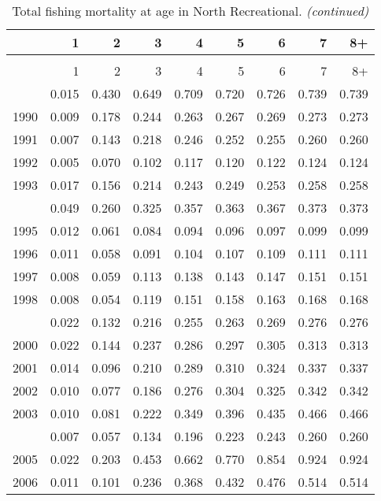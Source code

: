 \documentclass[
]{article}
\begin{document}
\begin{longtable}[t]{lrrrrrrrr}
\caption{\label{tab:North_Recreational-fleet-FAA-table}Total fishing mortality at age in North Recreational.}\\
\toprule
  & 1 & 2 & 3 & 4 & 5 & 6 & 7 & 8+\\
\midrule
\endfirsthead
\caption[]{Total fishing mortality at age in North Recreational. \textit{(continued)}}\\
\toprule
  & 1 & 2 & 3 & 4 & 5 & 6 & 7 & 8+\\
\midrule
\endhead

\endfoot
\bottomrule
\endlastfoot
1989 & 0.015 & 0.430 & 0.649 & 0.709 & 0.720 & 0.726 & 0.739 & 0.739\\
1990 & 0.009 & 0.178 & 0.244 & 0.263 & 0.267 & 0.269 & 0.273 & 0.273\\
1991 & 0.007 & 0.143 & 0.218 & 0.246 & 0.252 & 0.255 & 0.260 & 0.260\\
1992 & 0.005 & 0.070 & 0.102 & 0.117 & 0.120 & 0.122 & 0.124 & 0.124\\
1993 & 0.017 & 0.156 & 0.214 & 0.243 & 0.249 & 0.253 & 0.258 & 0.258\\
\addlinespace
1994 & 0.049 & 0.260 & 0.325 & 0.357 & 0.363 & 0.367 & 0.373 & 0.373\\
1995 & 0.012 & 0.061 & 0.084 & 0.094 & 0.096 & 0.097 & 0.099 & 0.099\\
1996 & 0.011 & 0.058 & 0.091 & 0.104 & 0.107 & 0.109 & 0.111 & 0.111\\
1997 & 0.008 & 0.059 & 0.113 & 0.138 & 0.143 & 0.147 & 0.151 & 0.151\\
1998 & 0.008 & 0.054 & 0.119 & 0.151 & 0.158 & 0.163 & 0.168 & 0.168\\
\addlinespace
1999 & 0.022 & 0.132 & 0.216 & 0.255 & 0.263 & 0.269 & 0.276 & 0.276\\
2000 & 0.022 & 0.144 & 0.237 & 0.286 & 0.297 & 0.305 & 0.313 & 0.313\\
2001 & 0.014 & 0.096 & 0.210 & 0.289 & 0.310 & 0.324 & 0.337 & 0.337\\
2002 & 0.010 & 0.077 & 0.186 & 0.276 & 0.304 & 0.325 & 0.342 & 0.342\\
2003 & 0.010 & 0.081 & 0.222 & 0.349 & 0.396 & 0.435 & 0.466 & 0.466\\
\addlinespace
2004 & 0.007 & 0.057 & 0.134 & 0.196 & 0.223 & 0.243 & 0.260 & 0.260\\
2005 & 0.022 & 0.203 & 0.453 & 0.662 & 0.770 & 0.854 & 0.924 & 0.924\\
2006 & 0.011 & 0.101 & 0.236 & 0.368 & 0.432 & 0.476 & 0.514 & 0.514\\

\end{longtable}
\end{document}
